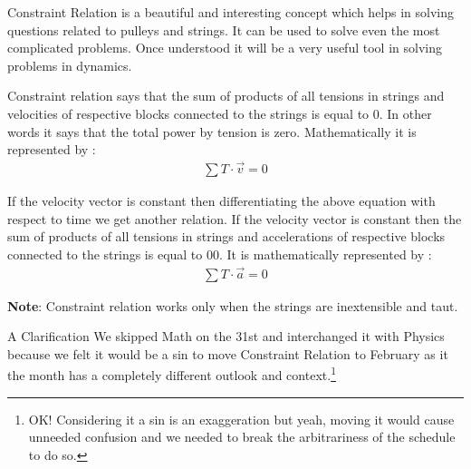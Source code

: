 \begin{phybox}{}
{Constraint Relation is a beautiful and interesting concept which helps in solving questions related to pulleys and strings. It can be used to solve even the most complicated problems. Once understood it will be a very useful tool in solving problems in dynamics.

Constraint relation says that the sum of products of all tensions in strings and velocities of respective blocks connected to the strings is equal to $0$. In other words it says that the total power by tension is zero. Mathematically it is represented by :
\begin{align*}
\displaystyle \sum T \cdot \Vec{v} = 0
\end{align*}

If the velocity vector is constant then differentiating the above equation with respect to time we get another relation. If the velocity vector is constant then the sum of products of all tensions in strings and accelerations of respective blocks connected to the strings is equal to 00. It is mathematically represented by :
\begin{align*}
    \displaystyle \sum T \cdot \Vec{a} = 0
\end{align*}

\textbf{Note}: Constraint relation works only when the strings are inextensible and taut.}
\end{phybox}
\begin{guidebox}{A Clarification}
{We skipped Math on the 31st and interchanged it with Physics because we felt it would be a sin to move Constraint Relation to February as it the month has a completely different outlook and context.\footnote{OK! Considering it a sin is an exaggeration but yeah, moving it would cause unneeded confusion and we needed to break the arbitrariness of the schedule to do so.}}
\end{guidebox}
\newpage
